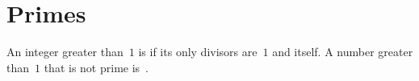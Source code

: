 \documentclass{ibl}  %
\begin{document}
\begin{bezoutproof}
\begin{problem}
\end{problem}
\end{bezoutproof}











\section{Primes}
\begin{df}
An integer greater than~$1$
is  if its only divisors are~$1$ and itself.
A number greater than~$1$ that is not prime is~.  
\end{df}
\end{document}
